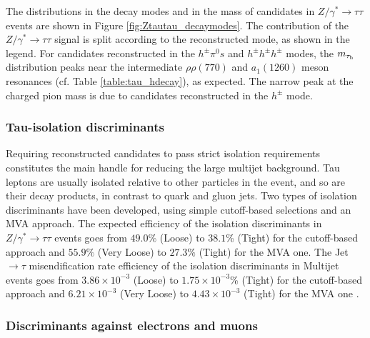 The distributions in the decay modes and in the mass of \hadtau candidates in \ensuremath{Z/\gamma^{*} \longrightarrow \tau\tau} events are shown in Figure \ref{fig:Ztautau_decaymodes}. The contribution of the \ensuremath{Z/\gamma^{*} \longrightarrow \tau\tau} signal is split according to the reconstructed \hadtau mode, as shown in the legend. For \hadtau candidates reconstructed in the \ensuremath{h^{\pm}\pi^{0}s} and \ensuremath{h^{\pm}h^{\pm}h^{\pm}} modes, the \ensuremath{m_{\hadtau}} distribution peaks near the intermediate \ensuremath{ρ\rho(770)} and \ensuremath{a_{1}(1260)} meson resonances (cf. Table \ref{table:tau_hdecay}), as expected. The narrow peak at the charged pion mass is due to \hadtau candidates reconstructed in the \ensuremath{h^{\pm}} mode.

\subsubsection{Tau-isolation discriminants}

Requiring reconstructed \hadtau candidates to pass strict isolation requirements constitutes the main handle for reducing the large multijet background. Tau leptons are usually isolated relative to other particles in the event, and so are their decay products, in contrast to quark and gluon jets. Two types of \hadtau isolation discriminants have been developed, using simple cutoff-based selections and an MVA approach. The expected efficiency of the \hadtau isolation discriminants in \ensuremath{Z/\gamma^{*} \longrightarrow \tau\tau} events goes from \ensuremath{49.0\%} (Loose) to \ensuremath{38.1}\% (Tight) for the cutoff-based approach and \ensuremath{55.9\%} (Very Loose) to \ensuremath{27.3\%} (Tight) for the MVA one. The Jet \ensuremath{\to \tau} misendification rate efficiency of the \hadtau isolation discriminants in Multijet events goes from \ensuremath{3.86 \times 10^{−3}} (Loose) to \ensuremath{1.75 \times 10^{−3}}\% (Tight) for the cutoff-based approach and \ensuremath{6.21 \times 10^{−3}} (Very Loose) to \ensuremath{4.43 \times 10^{−3}} (Tight) for the MVA one \cite{Khachatryan:2015dfa}.
 
\subsubsection{Discriminants against electrons and muons}


